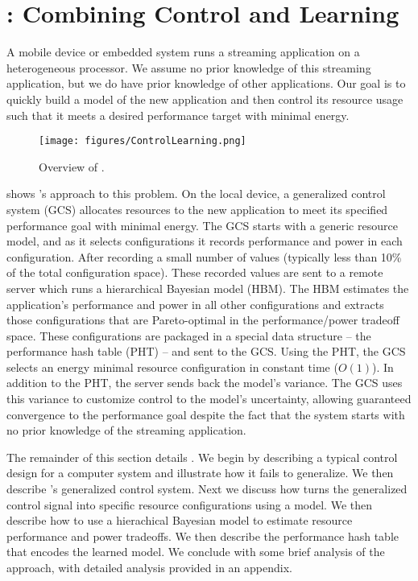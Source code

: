 \section{\SYSTEM{}: Combining Control and Learning}
\label{sec:framework}
A mobile device or embedded system runs a streaming application on a
heterogeneous processor.  We assume no prior knowledge of this
streaming application, but we do have prior knowledge of other
applications.  Our goal is to quickly build a model of the new
application and then control its resource usage such that it meets a
desired performance target with minimal energy.

\begin{figure}
\texttt{[image: figures/ControlLearning.png]}
\caption{Overview of \SYSTEM{}.} 
\label{fig:overview}
\end{figure}

 shows \SYSTEM{}'s approach to this problem.  On
the local device, a generalized control system (GCS) allocates
resources to the new application to meet its specified performance
goal with minimal energy.  The GCS starts with a generic resource
model, and as it selects configurations it records performance and
power in each configuration.  After recording a small number of values
(typically less than 10\% of the total configuration space).  These
recorded values are sent to a remote server which runs a hierarchical
Bayesian model (HBM).  The HBM estimates the application's performance
and power in all other configurations and extracts those
configurations that are Pareto-optimal in the performance/power
tradeoff space.  These configurations are packaged in a special data
structure -- the performance hash table (PHT) -- and sent to the GCS.
Using the PHT, the GCS selects an energy minimal resource
configuration in constant time ($O(1)$).  In addition to the PHT, the
server sends back the model's variance.  The GCS uses this variance to
customize control to the model's uncertainty, allowing guaranteed
convergence to the performance goal despite the fact that the system
starts with no prior knowledge of the streaming application.

The remainder of this section details \SYSTEM{}.  We begin by
describing a typical control design for a computer system and
illustrate how it fails to generalize.  We then describe \SYSTEM{}'s
generalized control system.  Next we discuss how \SYSTEM{} turns the
generalized control signal into specific resource configurations using
a model.  We then describe how to use a hierachical Bayesian model to
estimate resource performance and power tradeoffs.  We then describe
the performance hash table that encodes the learned model. We conclude
with some brief analysis of the approach, with detailed analysis
provided in an appendix.


